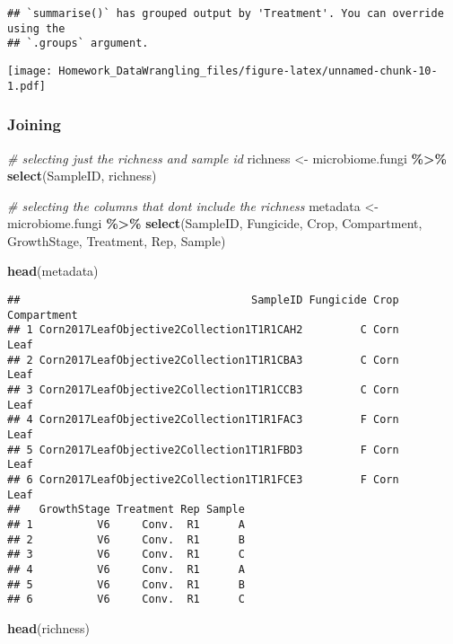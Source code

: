 \documentclass[
]{article}
\newenvironment{Shaded}{\begin{snugshade}}{\end{snugshade}}
\newcommand{\CommentTok}[1]{\textcolor[rgb]{0.56,0.35,0.01}{\textit{#1}}}
\newcommand{\FunctionTok}[1]{\textcolor[rgb]{0.13,0.29,0.53}{\textbf{#1}}}
\newcommand{\NormalTok}[1]{#1}
\newcommand{\OtherTok}[1]{\textcolor[rgb]{0.56,0.35,0.01}{#1}}
\newcommand{\SpecialCharTok}[1]{\textcolor[rgb]{0.81,0.36,0.00}{\textbf{#1}}}
\begin{document}
\begin{verbatim}
## `summarise()` has grouped output by 'Treatment'. You can override using the
## `.groups` argument.
\end{verbatim}

\texttt{[image: Homework\_DataWrangling\_files/figure-latex/unnamed-chunk-10-1.pdf]}

\subsubsection{Joining}\label{joining}

\begin{Shaded}
\begin{Highlighting}[]
\CommentTok{\# selecting just the richness and sample id }
\NormalTok{richness }\OtherTok{\textless{}{-}}\NormalTok{ microbiome.fungi }\SpecialCharTok{\%\textgreater{}\%} 
\FunctionTok{select}\NormalTok{(SampleID, richness)  }

\CommentTok{\# selecting the columns that dont include the richness}
\NormalTok{metadata }\OtherTok{\textless{}{-}}\NormalTok{ microbiome.fungi }\SpecialCharTok{\%\textgreater{}\%} 
\FunctionTok{select}\NormalTok{(SampleID, Fungicide, Crop, Compartment, GrowthStage, Treatment, Rep, Sample)}

\FunctionTok{head}\NormalTok{(metadata)}
\end{Highlighting}
\end{Shaded}

\begin{verbatim}
##                                    SampleID Fungicide Crop Compartment
## 1 Corn2017LeafObjective2Collection1T1R1CAH2         C Corn        Leaf
## 2 Corn2017LeafObjective2Collection1T1R1CBA3         C Corn        Leaf
## 3 Corn2017LeafObjective2Collection1T1R1CCB3         C Corn        Leaf
## 4 Corn2017LeafObjective2Collection1T1R1FAC3         F Corn        Leaf
## 5 Corn2017LeafObjective2Collection1T1R1FBD3         F Corn        Leaf
## 6 Corn2017LeafObjective2Collection1T1R1FCE3         F Corn        Leaf
##   GrowthStage Treatment Rep Sample
## 1          V6     Conv.  R1      A
## 2          V6     Conv.  R1      B
## 3          V6     Conv.  R1      C
## 4          V6     Conv.  R1      A
## 5          V6     Conv.  R1      B
## 6          V6     Conv.  R1      C
\end{verbatim}

\begin{Shaded}
\begin{Highlighting}[]
\FunctionTok{head}\NormalTok{(richness)}
\end{Highlighting}
\end{Shaded}
\end{document}
